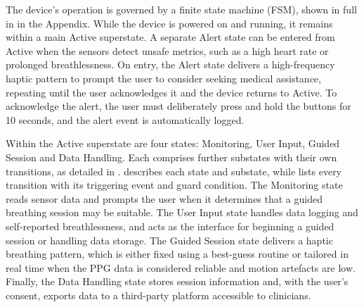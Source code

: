 The device's operation is governed by a finite state machine (FSM), shown in full in  in the Appendix. While the device is powered on and running, it remains within a main Active superstate. A separate Alert state can be entered from Active when the sensors detect unsafe metrics, such as a high heart rate or prolonged breathlessness. On entry, the Alert state delivers a high-frequency haptic pattern to prompt the user to consider seeking medical assistance, repeating until the user acknowledges it and the device returns to Active. To acknowledge the alert, the user must deliberately press and hold the buttons for 10 seconds, and the alert event is automatically logged.

Within the Active superstate are four states: Monitoring, User Input, Guided Session and Data Handling. Each comprises further substates with their own transitions, as detailed in .  describes each state and substate, while  lists every transition with its triggering event and guard condition. The Monitoring state reads sensor data and prompts the user when it determines that a guided breathing session may be suitable. The User Input state handles data logging and self-reported breathlessness, and acts as the interface for beginning a guided session or handling data storage. The Guided Session state delivers a haptic breathing pattern, which is either fixed using a best-guess routine or tailored in real time when the PPG data is considered reliable and motion artefacts are low. Finally, the Data Handling state stores session information and, with the user's consent, exports data to a third-party platform accessible to clinicians.
